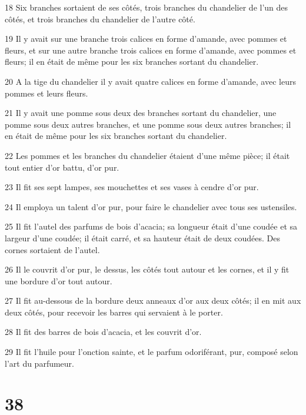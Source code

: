 \par 18 Six branches sortaient de ses côtés, trois branches du chandelier de l'un des côtés, et trois branches du chandelier de l'autre côté.
\par 19 Il y avait sur une branche trois calices en forme d'amande, avec pommes et fleurs, et sur une autre branche trois calices en forme d'amande, avec pommes et fleurs; il en était de même pour les six branches sortant du chandelier.
\par 20 A la tige du chandelier il y avait quatre calices en forme d'amande, avec leurs pommes et leurs fleurs.
\par 21 Il y avait une pomme sous deux des branches sortant du chandelier, une pomme sous deux autres branches, et une pomme sous deux autres branches; il en était de même pour les six branches sortant du chandelier.
\par 22 Les pommes et les branches du chandelier étaient d'une même pièce; il était tout entier d'or battu, d'or pur.
\par 23 Il fit ses sept lampes, ses mouchettes et ses vases à cendre d'or pur.
\par 24 Il employa un talent d'or pur, pour faire le chandelier avec tous ses ustensiles.
\par 25 Il fit l'autel des parfums de bois d'acacia; sa longueur était d'une coudée et sa largeur d'une coudée; il était carré, et sa hauteur était de deux coudées. Des cornes sortaient de l'autel.
\par 26 Il le couvrit d'or pur, le dessus, les côtés tout autour et les cornes, et il y fit une bordure d'or tout autour.
\par 27 Il fit au-dessous de la bordure deux anneaux d'or aux deux côtés; il en mit aux deux côtés, pour recevoir les barres qui servaient à le porter.
\par 28 Il fit des barres de bois d'acacia, et les couvrit d'or.
\par 29 Il fit l'huile pour l'onction sainte, et le parfum odoriférant, pur, composé selon l'art du parfumeur.

\chapter{38}

